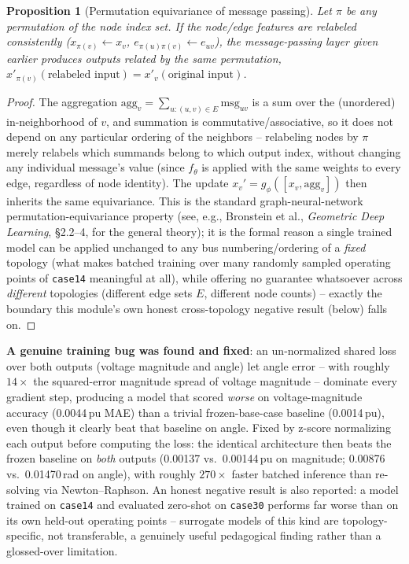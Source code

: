 \documentclass[11pt]{report}
\theoremstyle{plain}
\newtheorem{proposition}[theorem]{Proposition}
\theoremstyle{definition}
\theoremstyle{remark}
\begin{document}
\begin{proposition}[Permutation equivariance of message passing]
\label{prop:gnn-equivariance}
Let $\pi$ be any permutation of the node index set. If the node/edge
features are relabeled consistently ($x_{\pi(v)}\leftarrow x_v$,
$e_{\pi(u)\pi(v)}\leftarrow e_{uv}$), the message-passing layer
given earlier produces outputs related by the same permutation,
$x'_{\pi(v)}(\text{relabeled input})=x'_v(\text{original input})$.
\end{proposition}
\begin{proof}
The aggregation $\text{agg}_v=\sum_{u:(u,v)\in E}\text{msg}_{uv}$ is a
sum over the (unordered) in-neighborhood of $v$, and summation is
commutative/associative, so it does not depend on any particular
ordering of the neighbors -- relabeling nodes by $\pi$ merely relabels
which summands belong to which output index, without changing any
individual message's value (since $f_\theta$ is applied with the same
weights to every edge, regardless of node identity). The update
$x_v'=g_\phi([x_v,\text{agg}_v])$ then inherits the same equivariance.
This is the standard graph-neural-network permutation-equivariance
property (see, e.g., Bronstein et al., \emph{Geometric Deep Learning},
\S2.2--4, for the general theory); it is the formal reason a single
trained model can be applied unchanged to any bus numbering/ordering of
a \emph{fixed} topology (what makes batched training over many randomly
sampled operating points of \texttt{case14} meaningful at all), while
offering no guarantee whatsoever across \emph{different} topologies
(different edge sets $E$, different node counts) -- exactly the
boundary this module's own honest cross-topology negative result
(below) falls on.
\end{proof}

\textbf{A genuine training bug was found and
fixed}: an un-normalized shared loss over both outputs (voltage magnitude
and angle) let angle error -- with roughly $14\times$ the squared-error
magnitude spread of voltage magnitude -- dominate every gradient step,
producing a model that scored \emph{worse} on voltage-magnitude accuracy
(0.0044\,pu MAE) than a trivial frozen-base-case baseline (0.0014\,pu),
even though it clearly beat that baseline on angle. Fixed by z-score
normalizing each output before computing the loss: the identical
architecture then beats the frozen baseline on \emph{both} outputs
(0.00137 vs.\ 0.00144\,pu on magnitude; 0.00876 vs.\ 0.01470\,rad on
angle), with roughly $270\times$ faster batched inference than re-solving
via Newton--Raphson. An honest negative result is also reported: a model
trained on \texttt{case14} and evaluated zero-shot on \texttt{case30}
performs far worse than on its own held-out operating points --
surrogate models of this kind are topology-specific, not transferable, a
genuinely useful pedagogical finding rather than a glossed-over
limitation.
\end{document}

